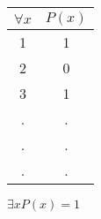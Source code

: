 \documentclass[russian]{lecture-notes}
\begin{document}
    \begin{table}[h!]
                \centering
                \begin{tabular}{|c|c|}
                    \hline
                    $\forall x $ & $P(x)$ \\ \hline
                    1      & 1       \\ \hline
                    2      & 0       \\ \hline
                    3      & 1       \\ \hline
                    .      & .       \\ \hline
                    .      & .       \\ \hline
                    .      & .       \\ \hline
                \end{tabular}
            \end{table}

    $\exists x P(x) = 1$
\end{document}
